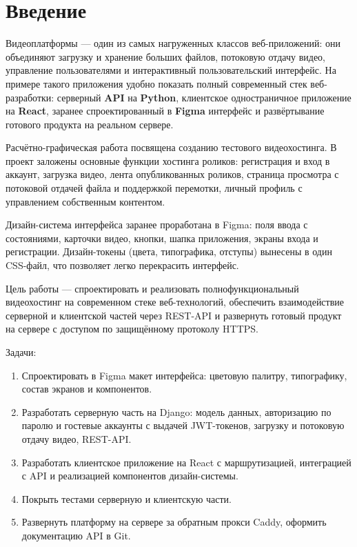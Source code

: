 \chapter*{Введение}
\label{ch:intro}

Видеоплатформы — один из самых нагруженных классов веб-приложений: они
объединяют загрузку и хранение больших файлов, потоковую отдачу видео,
управление пользователями и интерактивный пользовательский интерфейс.
На примере такого приложения удобно показать полный современный стек
веб-разработки: серверный \textbf{API} на \textbf{Python}, клиентское
одностраничное приложение на \textbf{React}, заранее спроектированный
в \textbf{Figma} интерфейс и развёртывание готового продукта на
реальном сервере.

Расчётно-графическая работа посвящена созданию тестового видеохостинга.
В проект заложены основные функции хостинга роликов: регистрация и
вход в аккаунт, загрузка видео, лента опубликованных роликов, страница
просмотра с потоковой отдачей файла и поддержкой перемотки, личный
профиль с управлением собственным контентом.

Дизайн-система интерфейса заранее проработана в Figma: поля ввода с
состояниями, карточки видео, кнопки, шапка приложения, экраны входа и
регистрации. Дизайн-токены (цвета, типографика, отступы) вынесены в
один CSS-файл, что позволяет легко перекрасить интерфейс.

Цель работы — спроектировать и реализовать полнофункциональный
видеохостинг на современном стеке веб-технологий, обеспечить
взаимодействие серверной и клиентской частей через REST-API и
развернуть готовый продукт на сервере с доступом по защищённому
протоколу HTTPS.

Задачи:
\begin{enumerate}
  \item Спроектировать в Figma макет интерфейса: цветовую палитру,
        типографику, состав экранов и компонентов.
  \item Разработать серверную часть на Django: модель данных,
        авторизацию по паролю и гостевые аккаунты с выдачей
        JWT-токенов, загрузку и потоковую отдачу видео, REST-API.
  \item Разработать клиентское приложение на React с маршрутизацией,
        интеграцией с API и реализацией компонентов дизайн-системы.
  \item Покрыть тестами серверную и клиентскую части.
  \item Развернуть платформу на сервере за обратным прокси Caddy,
        оформить документацию API в Git.
\end{enumerate}

